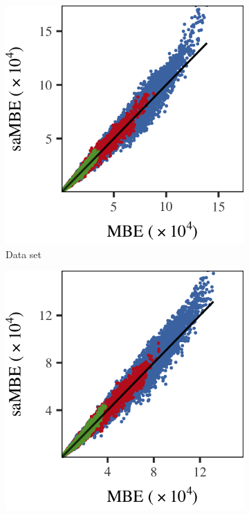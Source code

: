 		\begin{figure}
			\centering
			\begin{subfigure}{0.3\textwidth}
				\centering
				\includegraphics[keepaspectratio=true, width=\textwidth, height=0.23\textheight]{discussion/img/ferdosi_2_60000_mbe_sambe.png}
				\caption{Data set \ferdosiTwo}
				\label{fig:discussion:performance:mbevssambe:ferdosi2}
			\end{subfigure}
			\subfigvspace
			\begin{subfigure}{0.3\textwidth}
				\centering
				\includegraphics[keepaspectratio=true, width=\textwidth, height=0.23\textheight]{discussion/img/baakman_2_60000_mbe_sambe.png}

\end{subfigure}
\end{figure}
